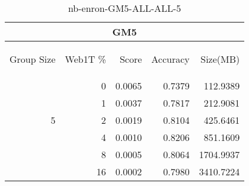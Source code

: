 \begin{center}
\begin{table}[htbp]
\begin{tabular}{ | r | r | r | r | r |}
\hline
\multicolumn{5}{|c|}{GM5}\\
\hline
\begin{sideways}Group Size\end{sideways} & \begin{sideways}Web1T \%\end{sideways} & \begin{sideways}Score\end{sideways} & \begin{sideways}Accuracy\end{sideways} & \begin{sideways}Size(MB)\end{sideways}\\
\hline
\multirow{5}{*}{5}
 & 0 & 0.0065 & 0.7379 & 112.9389\\ \cline{2-5}
 & 1 & 0.0037 & 0.7817 & 212.9081\\ \cline{2-5}
 & 2 & 0.0019 & 0.8104 & 425.6461\\ \cline{2-5}
 & 4 & 0.0010 & 0.8206 & 851.1609\\ \cline{2-5}
 & 8 & 0.0005 & 0.8064 & 1704.9937\\ \cline{2-5}
 & 16 & 0.0002 & 0.7980 & 3410.7224\\ \cline{2-5}
\hline
\end{tabular}
\caption{nb-enron-GM5-ALL-ALL-5}
\label{table:nb-enron-GM5-ALL-ALL-5}
\end{table}
\end{center}

